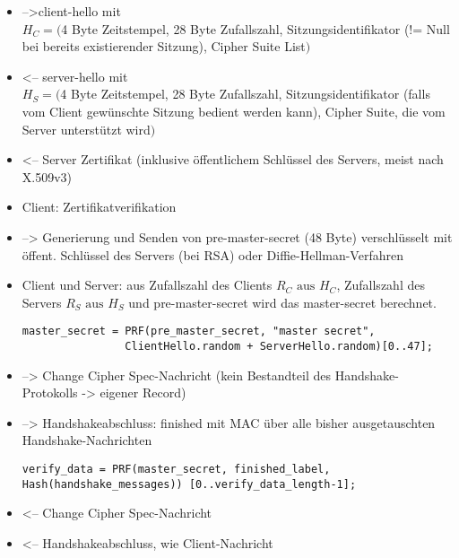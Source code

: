 \documentclass[
    12pt,
    headings=small,
    parskip=half,           %
    bibliography=totoc,
    numbers=noenddot,       %
    open=any,               %
    ]{scrreprt}
\newcommand{\mastersecret}		{master-secret}
\newcommand{\premastersecret}		{pre-master-secret}
\newcommand{\clienthello}			{client-hello}
\newcommand{\serverhello}			{server-hello}
\newcommand{\finished}				{finished}
\newcommand{\changecipherspec}	{Change Cipher Spec}
\begin{document}
\begin{itemize}
\item -->\clienthello{} mit \\
\(H_C = (\)4 Byte Zeitstempel, 28 Byte Zufallszahl, Sitzungsidentifikator (!= Null bei bereits existierender Sitzung), Cipher Suite List\()\)

\item <-- \serverhello{} mit \\
\(H_S = (\)4 Byte Zeitstempel, 28 Byte Zufallszahl, Sitzungsidentifikator (falls vom Client gewünschte Sitzung bedient werden kann), Cipher Suite, die vom Server unterstützt wird\()\)

\item <-- Server Zertifikat (inklusive öffentlichem Schlüssel des Servers, meist nach X.509v3)

\item Client: Zertifikatverifikation

\item --> Generierung und Senden von \premastersecret{} (48 Byte) verschlüsselt mit öffent. Schlüssel des Servers (bei RSA) oder Diffie-Hellman-Verfahren

\item Client und Server: aus Zufallszahl des Clients \(R_C \text{ aus } H_C\), Zufallszahl des Servers \(R_S \text{ aus } H_S\) und \premastersecret{} wird das \mastersecret{} berechnet.
\begin{lstlisting}
master_secret = PRF(pre_master_secret, "master secret",
				ClientHello.random + ServerHello.random)[0..47];
\end{lstlisting}

\item --> \changecipherspec{}-Nachricht (kein Bestandteil des Handshake-Protokolls -> eigener Record)

\item --> Handshakeabschluss: \finished{} mit MAC über alle bisher ausgetauschten Handshake-Nachrichten 
\begin{lstlisting}
verify_data = PRF(master_secret, finished_label, Hash(handshake_messages)) [0..verify_data_length-1];
\end{lstlisting}

\item <-- \changecipherspec{}-Nachricht

\item <-- Handshakeabschluss, wie Client-Nachricht
\end{itemize}
\end{document}
